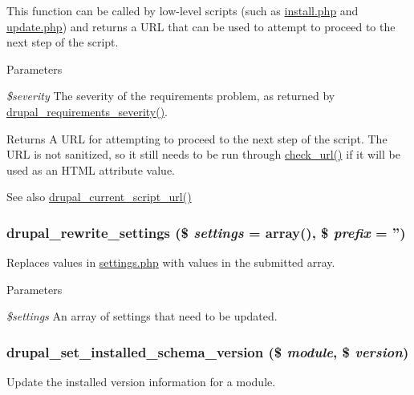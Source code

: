 This function can be called by low-\/level scripts (such as \hyperlink{install_8php}{install.php} and \hyperlink{update_8php}{update.php}) and returns a URL that can be used to attempt to proceed to the next step of the script.


\begin{DoxyParams}{Parameters}
\item[{\em \$severity}]The severity of the requirements problem, as returned by \hyperlink{install_8inc_aa9ea0f7df004333efbdd03025f5a9c94}{drupal\_\-requirements\_\-severity()}.\end{DoxyParams}
\begin{DoxyReturn}{Returns}
A URL for attempting to proceed to the next step of the script. The URL is not sanitized, so it still needs to be run through \hyperlink{group__sanitization_gac024315b69035ef05c33674838707919}{check\_\-url()} if it will be used as an HTML attribute value.
\end{DoxyReturn}
\begin{DoxySeeAlso}{See also}
\hyperlink{install_8inc_a75c4f99a27a5a65328abc0eaa1f928e3}{drupal\_\-current\_\-script\_\-url()} 
\end{DoxySeeAlso}
\hypertarget{install_8inc_ad99864750a734251d0a39fffe620ff53}{
\subsubsection[{drupal\_\-rewrite\_\-settings}]{\setlength{\rightskip}{0pt plus 5cm}drupal\_\-rewrite\_\-settings (\$ {\em settings} = {\ttfamily array()}, \/  \$ {\em prefix} = {\ttfamily ''})}}
\label{install_8inc_ad99864750a734251d0a39fffe620ff53}
Replaces values in \hyperlink{settings_8php}{settings.php} with values in the submitted array.


\begin{DoxyParams}{Parameters}
\item[{\em \$settings}]An array of settings that need to be updated. \end{DoxyParams}
\hypertarget{install_8inc_a2bc19b43e5872bf61c359839ccaec97b}{
\subsubsection[{drupal\_\-set\_\-installed\_\-schema\_\-version}]{\setlength{\rightskip}{0pt plus 5cm}drupal\_\-set\_\-installed\_\-schema\_\-version (\$ {\em module}, \/  \$ {\em version})}}
\label{install_8inc_a2bc19b43e5872bf61c359839ccaec97b}
Update the installed version information for a module.


